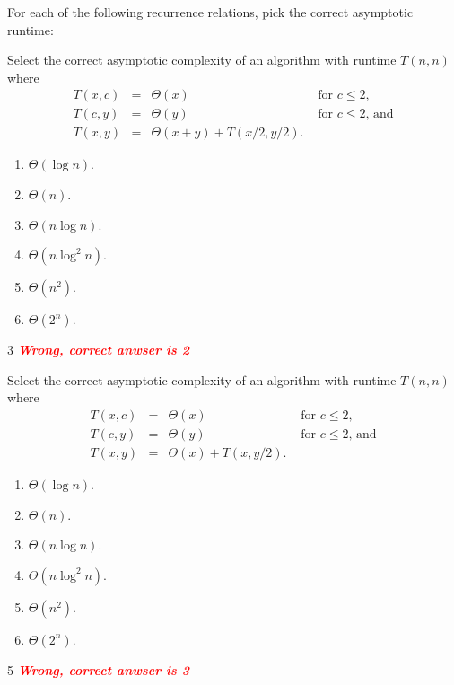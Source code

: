 \documentclass[12pt,twoside]{article}
\begin{document}
\begin{problems}
For each of the following recurrence relations,
pick the correct asymptotic runtime:

\begin{problemparts}

\problempart {}
Select the correct asymptotic complexity
of an algorithm with runtime $T(n, n)$
where 
$$
\begin{array}{rcll}
T(x, c) &=& \Theta(x) & \textrm{ for $c \le 2$}, \\
T(c, y) &=& \Theta(y) & \textrm{ for $c \le 2$, and} \\
T(x, y) &=& \Theta(x + y) + T(x / 2, y / 2).
\end{array}
$$

\begin{enumerate}
\item $\Theta(\log n)$.
\item $\Theta(n)$.
\item $\Theta(n \log n)$.
\item $\Theta(n \log^2 n)$.
\item $\Theta(n^2)$.
\item $\Theta(2^n)$.
\end{enumerate}

\ifsolution \solution{}
3 \textcolor{red}{\textit{ \textbf{  Wrong, correct anwser is  2 }}}
\fi

\problempart {}
Select the correct asymptotic complexity
of an algorithm with runtime $T(n, n)$
where 
$$
\begin{array}{rcll}
T(x, c) &=& \Theta(x) & \textrm{ for $c \le 2$}, \\
T(c, y) &=& \Theta(y) & \textrm{ for $c \le 2$, and} \\
T(x, y) &=& \Theta(x) + T(x, y / 2).
\end{array}
$$

\begin{enumerate}
\item $\Theta(\log n)$.
\item $\Theta(n)$.
\item $\Theta(n \log n)$.
\item $\Theta(n \log^2 n)$.
\item $\Theta(n^2)$.
\item $\Theta(2^n)$.
\end{enumerate}

\ifsolution \solution{}
5 \textcolor{red}{\textit{ \textbf{  Wrong, correct anwser is  3 }}}
\fi


\end{problemparts}
\end{problems}
\end{document}
